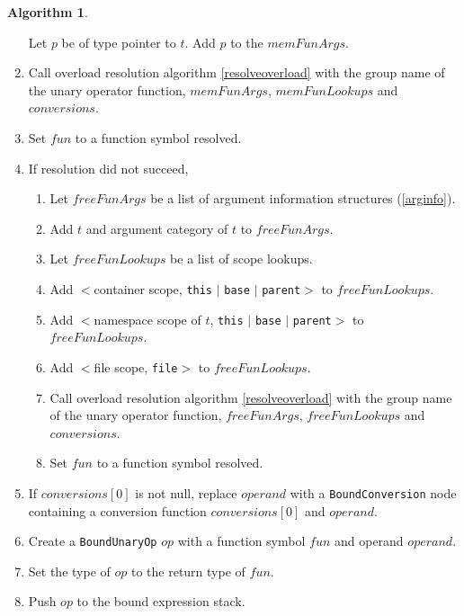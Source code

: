 \documentclass[a4paper,oneside,11pt]{book}
\theoremstyle{definition}
\newtheorem{algo}{Algorithm}[section]
\begin{document}
\begin{algo}
\begin{enumerate}
Let $p$ be of type pointer to $t$. Add $p$ to the $memFunArgs$.
\item
Call overload resolution algorithm \ref{resolveoverload} with the group name of the unary operator function, $memFunArgs$, $memFunLookups$ and $conversions$.
\item
Set $fun$ to a function symbol resolved.
\item
If resolution did not succeed,
\begin{enumerate}
\item
Let $freeFunArgs$ be a list of argument information structures (\ref{arginfo}).
\item
Add $t$ and argument category of $t$ to $freeFunArgs$.
\item
Let $freeFunLookups$ be a list of scope lookups.
\item
Add $<$container scope, \verb|this| $|$ \verb|base| $|$ \verb|parent|$>$ to $freeFunLookups$.
\item
Add $<$namespace scope of $t$, \verb|this| $|$ \verb|base| $|$ \verb|parent|$>$ to $freeFunLookups$.
\item
Add $<$file scope, \verb|file|$>$ to $freeFunLookups$.
\item
Call overload resolution algorithm \ref{resolveoverload} with the group name of the unary operator function, $freeFunArgs$, $freeFunLookups$ and $conversions$.
\item
Set $fun$ to a function symbol resolved.
\end{enumerate}
\item
If $conversions[0]$ is not null, replace $operand$ with a \verb|BoundConversion| node containing a conversion function $conversions[0]$ and $operand$.
\item
Create a \verb|BoundUnaryOp| $op$ with a function symbol $fun$ and operand $operand$.
\item
Set the type of $op$ to the return type of $fun$.
\item
Push $op$ to the bound expression stack.
\end{enumerate}
\end{algo}
\end{document}
